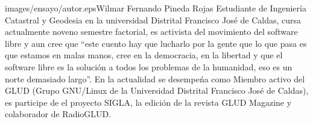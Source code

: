 \begin{multicols}{2}
\begin{biografia}{images/ensayo/autor.eps}{Wilmar Fernando Pineda Rojas} %
Estudiante de Ingeniería Catastral y Geodesia en la universidad Distrital Francisco José de Caldas, cursa actualmente noveno semestre factorial, 
es activista del movimiento del software libre y aun cree que ``este cuento hay que lucharlo por la gente que lo que pasa es que estamos en malas manos, 
cree en la democracia, en la libertad y que el software libre es la solución a todos los problemas de la humanidad, eso es un norte demasiado largo''. 
En la actualidad se desempeńa como Miembro activo del GLUD (Grupo GNU/Linux de la Universidad Distrital Francisco José de Caldas), 
es participe de el proyecto SIGLA, la edición de la revista GLUD Magazine y colaborador de RadioGLUD.  
\end{biografia}


\end{multicols} %


